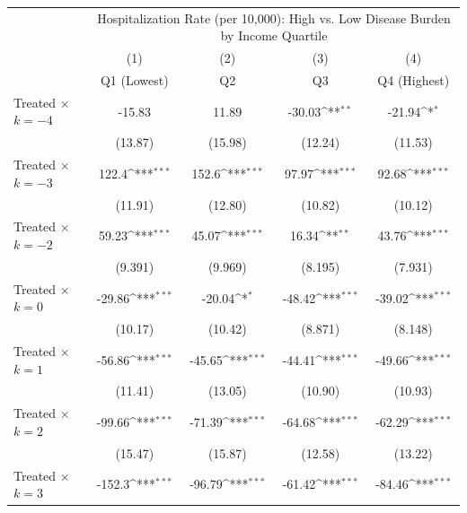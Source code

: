 {
\def\sym#1{\ifmmode^{#1}\else\(^{#1}\)\fi}
\begin{tabular}{l*{4}{c}}
\toprule
                    &\multicolumn{4}{c}{Hospitalization Rate (per 10,000): High vs. Low Disease Burden by Income Quartile}\\
                    &\multicolumn{1}{c}{(1)}&\multicolumn{1}{c}{(2)}&\multicolumn{1}{c}{(3)}&\multicolumn{1}{c}{(4)}\\
                    &\multicolumn{1}{c}{Q1 (Lowest)}&\multicolumn{1}{c}{Q2}&\multicolumn{1}{c}{Q3}&\multicolumn{1}{c}{Q4 (Highest)}\\
\midrule
Treated $\times$ $k = -4$&      -15.83         &       11.89         &      -30.03\sym{**} &      -21.94\sym{*}  \\
                    &     (13.87)         &     (15.98)         &     (12.24)         &     (11.53)         \\
\addlinespace
Treated $\times$ $k = -3$&       122.4\sym{***}&       152.6\sym{***}&       97.97\sym{***}&       92.68\sym{***}\\
                    &     (11.91)         &     (12.80)         &     (10.82)         &     (10.12)         \\
\addlinespace
Treated $\times$ $k = -2$&       59.23\sym{***}&       45.07\sym{***}&       16.34\sym{**} &       43.76\sym{***}\\
                    &     (9.391)         &     (9.969)         &     (8.195)         &     (7.931)         \\
\addlinespace
Treated $\times$ $k = 0$&      -29.86\sym{***}&      -20.04\sym{*}  &      -48.42\sym{***}&      -39.02\sym{***}\\
                    &     (10.17)         &     (10.42)         &     (8.871)         &     (8.148)         \\
\addlinespace
Treated $\times$ $k = 1$&      -56.86\sym{***}&      -45.65\sym{***}&      -44.41\sym{***}&      -49.66\sym{***}\\
                    &     (11.41)         &     (13.05)         &     (10.90)         &     (10.93)         \\
\addlinespace
Treated $\times$ $k = 2$&      -99.66\sym{***}&      -71.39\sym{***}&      -64.68\sym{***}&      -62.29\sym{***}\\
                    &     (15.47)         &     (15.87)         &     (12.58)         &     (13.22)         \\
\addlinespace
Treated $\times$ $k = 3$&      -152.3\sym{***}&      -96.79\sym{***}&      -61.42\sym{***}&      -84.46\sym{***}\\

\end{tabular}}
